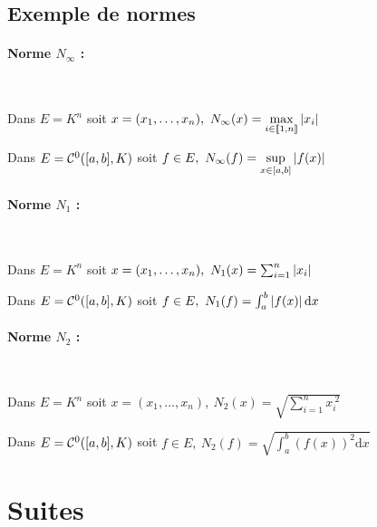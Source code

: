 		 \medskip
			
		 \medskip
		
		 \medskip
			
			
	\subsection{Exemple de normes}

		\paragraph{Norme $N_{\infty}$ :} ~
		
			Dans $E=K^n$ soit $x=(x_1,\dots ,x_n) ,~ N_{\infty}(x) = 
			\underset{i\in{\llbracket 1,n \rrbracket}}{\mathrm{max}} \left\vert x_i \right\vert$
		
			Dans $E={\mathcal{C}}^0([a,b],K)$ soit $f\in E,~N_{\infty} (f) = \underset{x\in [a,b]}{\mathrm{sup}} \left\vert f(x) \right\vert$
			
		\paragraph{Norme $N_1$ :} ~

			Dans $E=K^n$ soit $x=(x_1,\dots ,x_n) ,~ N_1(x) = \sum_{i=1}^n \left\vert x_i \right\vert $
			
			Dans $E={\mathcal{C}}^0([a,b],K)$ soit $f\in E,~N_1 (f) = \int_a^b \left\vert f(x) \right\vert \mathrm{d}x$
			
		\paragraph{Norme $N_2$ :} ~

			Dans $E=K^n$ soit $x=(x_1,\dots ,x_n) ,~ N_2(x) = \sqrt{\sum_{i=1}^n x_i^{~2}} $
			
			Dans $E={\mathcal{C}}^0([a,b],K)$ soit $f\in E,~N_2 (f) = \sqrt{\int_a^b \left( f(x)\right)^2 \mathrm{d}x}$
		
		\medskip


\section{Suites}
		
